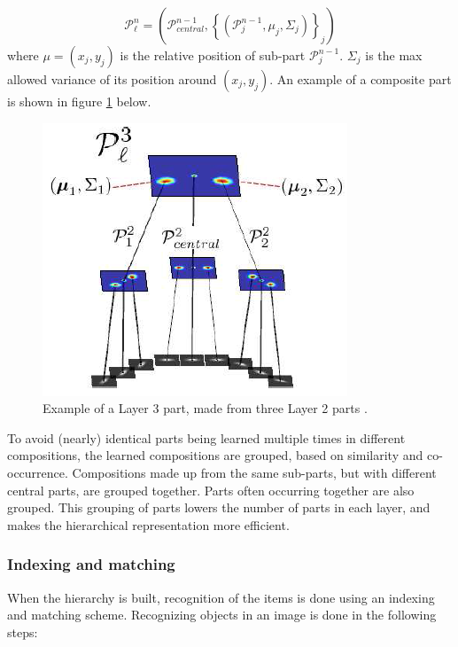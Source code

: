 \begin{equation}
\mathcal{P}_{\ell}^n = \left(\mathcal{P}_{central}^{n-1} , \left\{\left(\mathcal{P}_j^{n-1}, \mu_j, \Sigma_j \right) \right\}_j \right)
\label{eqn:composition_of_parts}
\end{equation}
where $\mu = (x_j, y_j)$ is the relative position of sub-part $\mathcal{P}_{j}^{n-1}$. 
$\Sigma_j$ is the max allowed variance of its position around $(x_j, y_j)$.
An example of a composite part is shown in figure \ref{fig:compositionality2} below.

\begin{figure}[h!] %
\centering
\includegraphics[scale=0.7]{graphics/compositionality2}
\caption[Example of a Layer 3 part]{Example of a Layer 3 part, made from three Layer 2 parts \citep[fig.~2]{fidler2009learning}.}
\label{fig:compositionality2}
\end{figure}

To avoid (nearly) identical parts being learned multiple times in different compositions,
the learned compositions are grouped, based on similarity and co-occurrence. 
Compositions made up from the same sub-parts, but with different central parts,
are grouped together. Parts often occurring together are also grouped.
This grouping of parts lowers the number of parts in each layer,
and makes the hierarchical representation more efficient.

\subsubsection{Indexing and matching}
\label{sec:indexing-matching}
When the hierarchy is built,
recognition of the items is done using an indexing and matching scheme.
Recognizing objects in an image is done in the following steps: 

